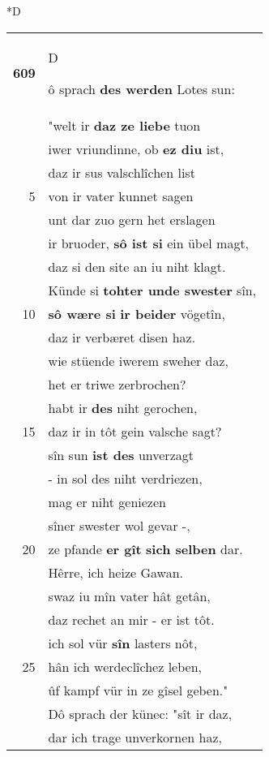 \documentclass[8pt,a4paper,notitlepage]{article}
\begin{document}
\begin{table}[ht]
\begin{minipage}[t]{0.5\linewidth}
\small
\begin{center}*D
\end{center}
\begin{tabular}{rl}
\textbf{609} & \begin{large}D\end{large}ô sprach \textbf{des werden} Lotes sun:\\ 
 & "welt ir \textbf{daz ze liebe} tuon\\ 
 & iwer vriundinne, ob \textbf{ez diu} ist,\\ 
 & daz ir sus valschlîchen list\\ 
5 & von ir vater kunnet sagen\\ 
 & unt dar zuo gern het erslagen\\ 
 & ir bruoder, \textbf{sô ist si} ein übel magt,\\ 
 & daz si den site an iu niht klagt.\\ 
 & Künde si \textbf{tohter unde swester} sîn,\\ 
10 & \textbf{sô wære si} \textbf{ir beider} vögetîn,\\ 
 & daz ir verbæret disen haz.\\ 
 & wie stüende iwerem sweher daz,\\ 
 & het er triwe zerbrochen?\\ 
 & habt ir \textbf{des} niht gerochen,\\ 
15 & daz ir in tôt gein valsche sagt?\\ 
 & sîn sun \textbf{ist des} unverzagt\\ 
 & - in sol des niht verdriezen,\\ 
 & mag er niht geniezen\\ 
 & sîner swester wol gevar -,\\ 
20 & ze pfande \textbf{er gît} \textbf{sich selben} dar.\\ 
 & Hêrre, ich heize Gawan.\\ 
 & swaz iu mîn vater hât getân,\\ 
 & daz rechet an mir - er ist tôt.\\ 
 & ich sol vür \textbf{sîn} lasters nôt,\\ 
25 & hân ich werdeclîchez leben,\\ 
 & ûf kampf vür in ze gîsel geben."\\ 
 & Dô sprach der künec: "sît ir daz,\\ 
 & dar ich trage unverkornen haz,\\ 

\end{tabular}
\end{minipage}
\end{table}
\end{document}
